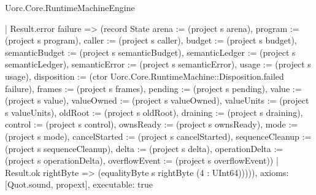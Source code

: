 \begin{lexlean}{Uorc.Core.RuntimeMachineEngine}
\begin{semanticmodule}
{      | Result.error failure => (record State {arena := (project s arena), program := (project s program), caller := (project s caller), budget := (project s budget), semanticBudget := (project s semanticBudget), semanticLedger := (project s semanticLedger), semanticError := (project s semanticError), usage := (project s usage), disposition := (ctor Uorc.Core.RuntimeMachine::Disposition.failed failure), frames := (project s frames), pending := (project s pending), value := (project s value), valueOwned := (project s valueOwned), valueUnits := (project s valueUnits), oldRoot := (project s oldRoot), draining := (project s draining), control := (project s control), ownsReady := (project s ownsReady), mode := (project s mode), cancelStarted := (project s cancelStarted), sequenceCleanup := (project s sequenceCleanup), delta := (project s delta), operationDelta := (project s operationDelta), overflowEvent := (project s overflowEvent)})
      | Result.ok rightByte => (equalityByte s rightByte (4 : UInt64))))),
  axioms: [Quot.sound, propext],
  executable: true
}


\end{semanticmodule}
\end{lexlean}
